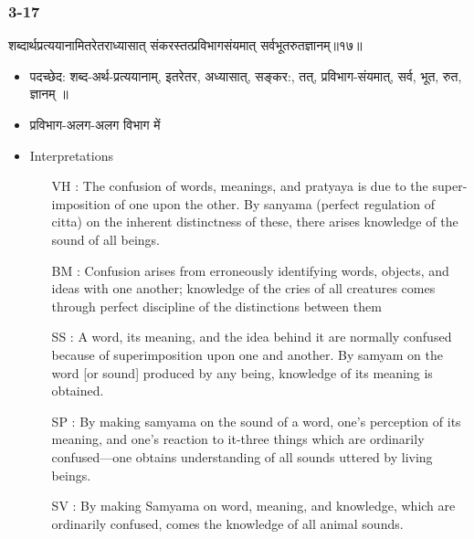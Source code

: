 \begin{frame}[fragile]\frametitle{3-17}
\begin{sanskrit}
शब्दार्थप्रत्ययानामितरेतराध्यासात् संकरस्तत्प्रविभागसंयमात् सर्वभूतरुतज्ञानम्॥१७॥
\end{sanskrit}

	\begin{itemize}
	\item पदच्छेद:  शब्द-अर्थ-प्रत्ययानाम्, इतरेतर, अध्यासात्‌, सङ्कर:, तत्, प्रविभाग-संयमात्, सर्व, भूत, रुत, ज्ञानम् ॥
	\item प्रविभाग-अलग-अलग विभाग में
	\item Interpretations
		\begin{itemize}	
		\item [VH]: The confusion of words, meanings, and pratyaya is due to the super-imposition of one upon the other. By sanyama (perfect regulation of citta) on the inherent distinctness of these, there arises knowledge of the sound of all beings.
		\item [BM]: Confusion arises from erroneously identifying words, objects, and ideas with one another; knowledge of the cries of all creatures comes through perfect discipline of the distinctions between them
		\item [SS]: A word, its meaning, and the idea behind it are normally confused because of superimposition upon one and another. By samyam on the word [or sound] produced by any being, knowledge of its meaning is obtained.
		\item [SP]: By making samyama on the sound of a word, one’s perception of its meaning, and one’s reaction to it-three things which are ordinarily confused—one obtains understanding of all sounds uttered by living beings.
		\item [SV]: By making Samyama on word, meaning, and knowledge, which are ordinarily confused, comes the knowledge of all animal sounds. 
		\end{itemize}
	\end{itemize}
\end{frame}

